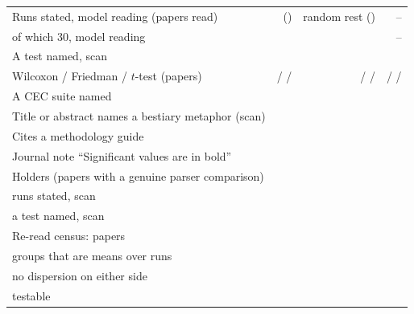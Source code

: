 \documentclass[preprint,review,12pt]{elsarticle}
\begin{document}
\begin{table}[t]
{\begin{tabular}{@{}lrrr@{}}
Runs stated, model reading (papers read) & \nTrNewOptimizerPctRunsStated{} (\nTrNewOptimizerPapers{}) & random rest \nTrRandomOtherPctRunsStated{} (\nTrRandomOtherPapers{}) & -- \\
\quad of which 30, model reading & \nTrNewOptimizerPctRunsThirty{} & \nTrRandomOtherPctRunsThirty{} & -- \\
A test named, scan & \nSkNewOptimizerPctTestNamed{} & \nSkApplicationPctTestNamed{} & \nSkAllPctTestNamed{} \\
\quad Wilcoxon / Friedman / $t$-test (papers) & \nSkNewOptimizerWilcoxon{} / \nSkNewOptimizerFriedman{} / \nSkNewOptimizerTTest{} & \nSkApplicationWilcoxon{} / \nSkApplicationFriedman{} / \nSkApplicationTTest{} & \nSkAllWilcoxon{} / \nSkAllFriedman{} / \nSkAllTTest{} \\
A CEC suite named & \nSkNewOptimizerPctCec{} & \nSkApplicationPctCec{} & \nSkAllPctCec{} \\
Title or abstract names a bestiary metaphor (scan) & \nSkNewOptimizerPctBestiaryHit{} & \nSkApplicationPctBestiaryHit{} & \nSkAllPctBestiaryHit{} \\
Cites a methodology guide & \nSkNewOptimizerPctCitesMethodology{} & \nSkApplicationPctCitesMethodology{} & \nSkAllPctCitesMethodology{} \\
Journal note ``Significant values are in bold'' & \nBnNewOptimizerPct{} & \nBnApplicationPct{} & \nBnAllPct{} \\
Holders (papers with a genuine parser comparison) & \nHkNewOptimizerPapers{} & \nHkApplicationPapers{} & \nHkAllPapers{} \\
\quad runs stated, scan & \nHkNewOptimizerPctRunsStated{} & \nHkApplicationPctRunsStated{} & \nHkAllPctRunsStated{} \\
\quad a test named, scan & \nHkNewOptimizerPctTestNamed{} & \nHkApplicationPctTestNamed{} & \nHkAllPctTestNamed{} \\
\midrule
Re-read census: papers & \nCrcNewOptimizerPapers{} & \nCrcApplicationPapers{} & \nCrcAllPapers{} \\
\quad groups that are means over runs & \nCrcMeansNewOptimizerGroups{} & \nCrcMeansApplicationGroups{} & \nCrcMeansGroups{} \\
\quad no dispersion on either side & \nCrcMeansNewOptimizerNeither{} \nCrcMeansNewOptimizerNeitherCi{} & \nCrcMeansApplicationNeither{} \nCrcMeansApplicationNeitherCi{} & \nCrcMeansNeither{} \nCrcMeansNeitherCi{} \\
\quad testable & \nCrcMeansNewOptimizerTestable{} \nCrcMeansNewOptimizerTestableCi{} & \nCrcMeansApplicationTestable{} \nCrcMeansApplicationTestableCi{} & \nCrcMeansTestable{} \nCrcMeansTestableCi{} \\

\end{tabular}}
\end{table}
\end{document}
